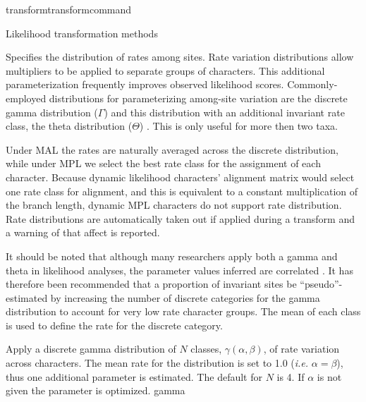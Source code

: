 \begin{command}{transform}{transformcommand}
\begin{arguments}
\begin{argumentgroup}{Likelihood transformation methods}
                {Specifies the distribution of rates among sites. Rate
                variation distributions allow multipliers to be applied to
                separate groups of characters. This additional parameterization
                frequently improves observed likelihood scores.
                Commonly-employed distributions for parameterizing among-site
                variation are the discrete gamma distribution ($\Gamma$)
                \cite{yang1994a} and this distribution with an additional
                invariant rate class, the theta distribution ($\Theta$)
                \cite{gu1995}. This is only useful for more then two taxa.
                
                \begin{statement}
                    Under MAL the rates are naturally averaged across the
                    discrete distribution, while under MPL we select the best
                    rate class for the assignment of each character. Because
                    dynamic likelihood characters' alignment matrix would select
                    one rate class for alignment, and this is equivalent to a
                    constant multiplication of the branch length, dynamic MPL
                    characters do not support rate distribution. Rate distributions are
                    automatically taken out if applied during a transform and a
                    warning of that affect is reported.
                \end{statement}

                \begin{statement}
                    It should be noted that although many researchers apply both
                    a gamma and theta in likelihood analyses, the parameter
                    values inferred are correlated \cite{sullivan1999}.  It has
                    therefore been recommended that a proportion of invariant
                    sites be ``pseudo''-estimated by increasing the number of
                    discrete categories for the gamma distribution to account
                    for very low rate character groups. The mean of each class
                    is used to define the rate for the discrete category.
                \end{statement}

                \begin{description}

                        {Apply a discrete gamma distribution of $N$ classes,
                        $\gamma(\alpha,\beta)$, of rate variation across
                        characters. The mean rate for the distribution is set to
                        1.0 (\emph{i.e.} $\alpha = \beta$), thus one additional parameter is
                        estimated. The default for $N$ is 4. If $\alpha$ is
                        not given the parameter is optimized.}
                        {gamma}


\end{description}}
\end{argumentgroup}
\end{arguments}
\end{command}
